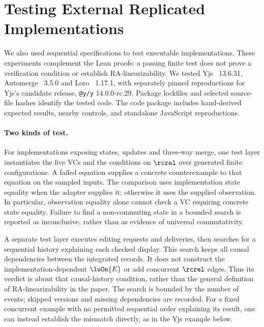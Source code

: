 \section{Testing External Replicated Implementations}
\label{app:property-testing}

We also used sequential specifications to test executable implementations.
These experiments complement the Lean proofs: a passing finite test does not
prove a verification condition or establish RA-linearizability. We tested
Yjs~\cite{YjsLibrary} 13.6.31, Automerge~\cite{Automerge} 3.5.0 and
Loro~\cite{LoroLibrary} 1.17.1, with separately pinned reproductions for
Yjs's candidate release, \texttt{@y/y} 14.0.0-rc.29. Package lockfiles and
selected source-file hashes identify the tested code. The code package
includes hand-derived expected results, nearby controls, and standalone
JavaScript reproductions.

\paragraph{Two kinds of test.}
For implementations exposing states, updates and three-way merge, one test
layer instantiates the five VCs and the conditions on $\rcrel$ over generated
finite configurations. A failed equation supplies a concrete counterexample
to that equation on the sampled inputs. The comparison uses implementation
state equality when the adapter supplies it; otherwise it uses the supplied
observation. In particular, observation equality alone cannot check a VC
requiring concrete state equality. Failure to find a non-commuting state in
a bounded search is reported as inconclusive, rather than as evidence of
universal commutativity.

A separate test layer executes editing requests and deliveries, then searches
for a sequential history explaining each checked display. This search keeps
all causal dependencies between the integrated records. It does not construct
the implementation-dependent $\loOn{E}$ or add concurrent $\rcrel$ edges.
Thus its verdict is about that causal-history condition, rather than the
general definition of RA-linearizability in the paper. The search is bounded
by the number of events; skipped versions and missing dependencies are
recorded. For a fixed concurrent example with no permitted sequential order
explaining its result, one can instead establish the mismatch directly, as
in the Yjs example below.

